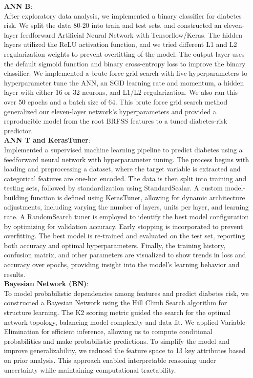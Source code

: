 \documentclass[conference]{IEEEtran}
\begin{document}
\noindent
\textbf{ANN B}:\\
After exploratory data analysis, we implemented a binary classifier for diabetes risk. We split the data 80-20 into train and test sets, and constructed an eleven-layer feedforward Artificial Neural Network with Tensorflow/Keras. The hidden layers utilized the ReLU activation function, and we tried different L1 and L2 regularization weights to prevent overfitting of the model. The output layer uses the default sigmoid function and binary cross-entropy loss to improve the binary classifier. We implemented a brute-force grid search with five hyperparameters to hyperparameter tune the ANN, an SGD learning rate and momentum, a hidden layer with either 16 or 32 neurons, and L1/L2 regularization. We also ran this over 50 epochs and a batch size of 64.
This brute force grid search method generalized our eleven-layer network’s hyperparameters and provided a reproducible model from the root BRFSS features to a tuned diabetes‐risk predictor.\\ 


\noindent
\textbf{ANN T and KerasTuner}:\\
Implemented a supervised machine learning pipeline to predict diabetes using a feedforward neural network with hyperparameter tuning. The process begins with loading and preprocessing a dataset, where the target variable is extracted and categorical features are one-hot encoded. The data is then split into training and testing sets, followed by standardization using StandardScalar. A custom model-building function is defined using KerasTuner, allowing for dynamic architecture adjustments, including varying the number of layers, units per layer, and learning rate. A RandomSearch tuner is employed to identify the best model configuration by optimizing for validation accuracy. Early stopping is incorporated to prevent overfitting. The best model is re-trained and evaluated on the test set, reporting both accuracy and optimal hyperparameters. Finally, the training history, confusion matrix, and other parameters are visualized to show trends in loss and accuracy over epochs, providing insight into the model's learning behavior and results.\\

\noindent
\textbf{Bayesian Network (BN)}:\\
To model probabilistic dependencies among features and predict diabetes risk, we constructed a Bayesian Network using the Hill Climb Search algorithm for structure learning. The K2 scoring metric guided the search for the optimal network topology, balancing model complexity and data fit. We applied Variable Elimination for efficient inference, allowing us to compute conditional probabilities and make probabilistic predictions. To simplify the model and improve generalizability, we reduced the feature space to 13 key attributes based on prior analysis. This approach enabled interpretable reasoning under uncertainty while maintaining computational tractability.\\
\end{document}
